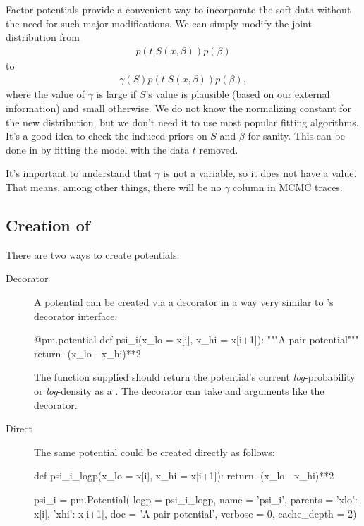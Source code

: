 \documentclass[]{jss}
\begin{document}
Factor potentials provide a convenient way to incorporate the soft data without the need for such major modifications. We can simply modify the joint distribution from
\begin{eqnarray*}
    p(t|S(x,\beta)) p(\beta)
\end{eqnarray*}
to
\begin{eqnarray*}
    \gamma(S) p(t|S(x,\beta)) p(\beta),
\end{eqnarray*}
where the value of $\gamma$ is large if $S$'s value is plausible (based on our external information) and small otherwise. We do not know the normalizing constant for the new distribution, but we don't need it to use most popular fitting algorithms. It's a good idea to check the induced priors on $S$ and $\beta$ for sanity. This can be done in  by fitting the model with the data $t$ removed.

It's important to understand that $\gamma$ is not a variable, so it does not have a value. That means, among other things, there will be no $\gamma$ column in MCMC traces.


\subsection[Creation of Potentials]{Creation of }
There are two ways to create potentials:
\begin{description}
    \item[Decorator] A potential can be created via a decorator in a way very similar to 's decorator interface:
\begin{CodeInput}
@pm.potential
def psi_i(x_lo = x[i], x_hi = x[i+1]):
"""A pair potential"""
return -(x_lo - x_hi)**2
\end{CodeInput}
The function supplied should return the potential's current \emph{log}-probability or \emph{log}-density as a  . The  decorator can take  and  arguments like the  decorator.
    \item[Direct] The same potential could be created directly as follows:
\begin{CodeInput}
def psi_i_logp(x_lo = x[i], x_hi = x[i+1]):
return -(x_lo - x_hi)**2

psi_i = pm.Potential(  logp = psi_i_logp,
                name = 'psi_i',
                parents = {'xlo': x[i], 'xhi': x[i+1]},
                doc = 'A pair potential',
                verbose = 0,
                cache_depth = 2)
\end{CodeInput}
\end{description}
\end{document}
